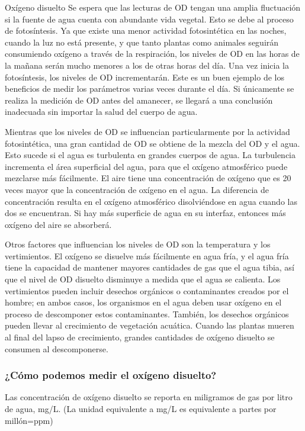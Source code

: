 Oxígeno disuelto
Se espera que las lecturas de OD tengan una amplia fluctuación si la fuente de agua cuenta con abundante vida vegetal. 
Esto se debe al proceso de fotosíntesis. 
Ya que existe una menor actividad fotosintética en las noches, cuando la luz no está presente, y que tanto plantas como animales seguirán consumiendo oxígeno a través de la respiración, los niveles de OD en las horas de la mañana serán mucho menores a los de otras horas del día. 
Una vez inicia la fotosíntesis, los niveles de OD incrementarán. 
Este es un buen ejemplo de los beneficios de medir los parámetros varias veces durante el día. 
Si únicamente se realiza la medición de OD antes del amanecer, se llegará a una conclusión inadecuada sin importar la salud del cuerpo de agua.

Mientras que los niveles de OD se influencian particularmente por la actividad fotosintética, una gran cantidad de OD se obtiene de la mezcla del OD y el agua. 
Esto sucede si el agua es turbulenta en grandes cuerpos de agua. 
La turbulencia incrementa el área superficial del agua, para que el oxígeno atmosférico puede mezclarse más fácilmente. 
El aire tiene una concentración de oxígeno que es 20 veces mayor que la concentración de oxígeno en el agua. 
La diferencia de concentración resulta en el oxígeno atmosférico disolviéndose en agua cuando las dos se encuentran. 
Si hay más superficie de agua en su interfaz, entonces más oxígeno del aire se absorberá.

Otros factores que influencian los niveles de OD son la temperatura y los vertimientos. 
El oxígeno se disuelve más fácilmente en agua fría, y el agua fría tiene la capacidad de mantener mayores cantidades de gas que el agua tibia, así que el nivel de OD disuelto disminuye a medida que el agua se calienta. 
Los vertimientos pueden incluir desechos orgánicos o contaminantes creados por el hombre; en ambos casos, los organismos en el agua deben usar oxígeno en el proceso de descomponer estos contaminantes.  
También, los desechos orgánicos pueden llevar al crecimiento de vegetación acuática.  
Cuando las plantas mueren al final del lapso de crecimiento, grandes cantidades de oxígeno disuelto se consumen al descomponerse.

\subsubsection{¿Cómo podemos medir el oxígeno disuelto?}
Las concentración de oxígeno disuelto se reporta en miligramos de gas por litro de agua, mg/L. (La unidad equivalente a mg/L es equivalente a partes por millón=ppm)  

